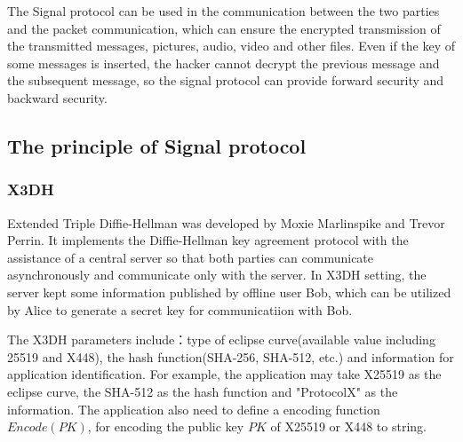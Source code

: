 \documentclass[11pt,en]{elegantpaper}
\begin{document}
The Signal protocol can be used in the communication between the two parties and the packet communication, which can ensure the encrypted transmission of the transmitted messages, pictures, audio, video and other files. Even if the key of some messages is inserted, the hacker cannot decrypt the previous message and the subsequent message, so the signal protocol can provide forward security and backward security.

\subsection{The principle of Signal protocol}


\subsubsection{X3DH}
Extended Triple Diffie-Hellman was developed by Moxie Marlinspike and Trevor Perrin. It implements the Diffie-Hellman key agreement protocol with the assistance of a central server so that both parties can communicate asynchronously and communicate only with the server. In X3DH setting, the server kept some information published by offline user Bob, which can be utilized by Alice to generate a secret key for communicatiion with Bob.

The X3DH parameters include：type of eclipse curve(available value including 25519 and X448), the hash function(SHA-256, SHA-512, etc.) and information for application identification. For example, the application may take X25519 as the eclipse curve, the SHA-512 as the hash function and "ProtocolX" as the information. The application also need to define a encoding function $Encode(PK)$, for encoding the public key $PK$ of X25519 or X448 to string.
\end{document}
